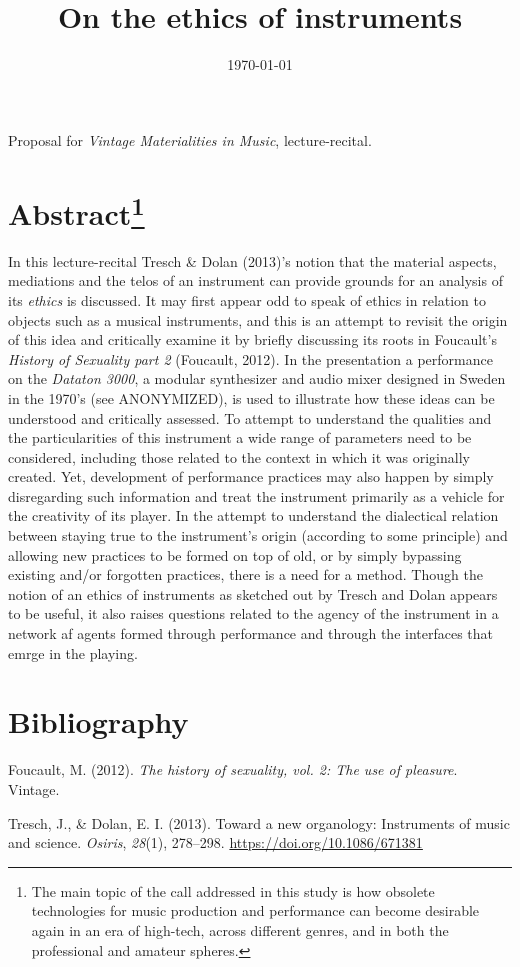 \documentclass[11pt]{article}
\date{\today}
\title{On the ethics of instruments}
\makeatletter
\newcommand{\citeprocitem}[2]{\hyper@linkstart{cite}{citeproc_bib_item_#1}#2\hyper@linkend}
\makeatother
\begin{document}
\maketitle
\noindent
Proposal for \emph{Vintage Materialities in Music}, lecture-recital.
\section*{Abstract\footnote{The main topic of the call addressed in this study is how obsolete technologies for music production and performance can become desirable again in an era of high-tech, across different genres, and in both the professional and amateur spheres.}}
\label{sec:orga7b8591}

In this lecture-recital Tresch \& Dolan (\citeprocitem{2}{2013})'s notion that the material aspects, mediations and the telos of an instrument can provide grounds for an analysis of its  \emph{ethics} is discussed. It may first appear odd to speak of ethics in relation to objects such as a musical instruments, and this is an attempt to revisit the origin of this idea and critically examine it by briefly discussing its roots in Foucault's \emph{History of Sexuality part 2} (\citeprocitem{1}{Foucault, 2012}). In the presentation a performance on the \emph{Dataton 3000}, a modular synthesizer and audio mixer designed in Sweden in the 1970's (see ANONYMIZED), is used to illustrate how these ideas can be understood and critically assessed. To attempt to understand the qualities and the particularities of this instrument a wide range of parameters need to be considered, including those related to the context in which it was originally created. Yet, development of performance practices may also happen by simply disregarding such information and treat the instrument primarily as a vehicle for the creativity of its player. In the attempt to understand the dialectical relation between staying true to the instrument's origin (according to some principle) and allowing new practices to be formed on top of old, or by simply bypassing existing and/or forgotten practices, there is a need for a method. Though the notion of an ethics of instruments as sketched out by Tresch and Dolan appears to be useful, it also raises questions related to the agency of the instrument in a network af agents formed through performance and through the interfaces that emrge in the playing.

\vspace{1cm}


\section*{Bibliography}
\label{sec:org86e3f90}
\begin{hangparas}{1.5em}{1}
\hypertarget{citeproc_bib_item_1}{Foucault, M. (2012). \textit{The history of sexuality, vol. 2: The use of pleasure}. Vintage.}

\hypertarget{citeproc_bib_item_2}{Tresch, J., \& Dolan, E. I. (2013). Toward a new organology: Instruments of music and science. \textit{Osiris}, \textit{28}(1), 278–298. \url{https://doi.org/10.1086/671381}}
\end{hangparas}
\end{document}
